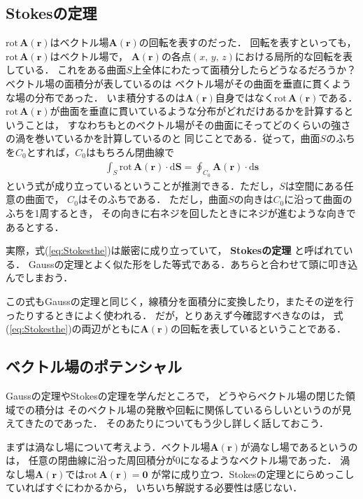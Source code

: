 \subsection{\textrm{ Stokes}の定理}
$\mathrm{rot} \, \bm{A}(\bm{r})$はベクトル場$\bm{A}(\bm{r})$の回転を表すのだった．
回転を表すといっても，$\mathrm{rot} \, \bm{A}(\bm{r})$はベクトル場で，
$\bm{A}(\bm{r})$の各点$(x, \, y, \, z)$における局所的な回転を表している．
これをある曲面$S$上全体にわたって面積分したらどうなるだろうか？ ベクトル場の面積分が表しているのは
ベクトル場がその曲面を垂直に貫くような場の分布であった．
いま積分するのは$\bm{A}(\bm{r})$自身ではなく$\mathrm{rot} \, \bm{A}(\bm{r})$である．
$\mathrm{rot} \, \bm{A}(\bm{r})$が曲面を垂直に貫いているような分布がどれだけあるかを計算するということは，
すなわちもとのベクトル場がその曲面にそってどのくらいの強さの渦を巻いているかを計算しているのと
同じことである．従って，曲面$S$のふちを$C_0$とすれば，$C_0$はもちろん閉曲線で
\begin{eqnarray}
\int_S \mathrm{rot} \, \bm{A}(\bm{r}) \cdot \mathrm{d} \bm{S} =
\oint_{C_0} \bm{A}(\bm{r}) \cdot \mathrm{d}\bm{s}
\label{eq:Stokesthe}
\end{eqnarray}
という式が成り立っているということが推測できる．ただし，$S$は空間にある任意の曲面で，
$C_0$はそのふちである．
ただし，曲面$S$の向きは$C_0$に沿って曲面のふちを1周するとき，
その向きに右ネジを回したときにネジが進むような向きであるとする．

実際，式(\ref{eq:Stokesthe})は厳密に成り立っていて，
\textbf{Stokesの定理}
と呼ばれている．
Gaussの定理とよく似た形をした等式である．あちらと合わせて頭に叩き込んでしまおう．

この式もGaussの定理と同じく，線積分を面積分に変換したり，またその逆を行ったりするときによく使われる．
だが，とりあえず今確認すべきなのは，
式(\ref{eq:Stokesthe})の両辺がともに$\bm{A}(\bm{r})$の回転を表しているということである．

\subsection{ベクトル場のポテンシャル}
Gaussの定理やStokesの定理を学んだところで，
どうやらベクトル場の閉じた領域での積分は
そのベクトル場の発散や回転に関係しているらしいというのが見えてきたのであった．
そのあたりについてもう少し詳しく話しておこう．

まずは渦なし場について考えよう．ベクトル場$\bm{A}(\bm{r})$が渦なし場であるというのは，
任意の閉曲線に沿った周回積分が0になるようなベクトル場であった．
渦なし場$\bm{A}(\bm{r})$では$\mathrm{rot} \, \bm{A}(\bm{r}) = \bm{0}$
が常に成り立つ．Stokesの定理とにらめっこしていればすぐにわかるから，
いちいち解説する必要性は感じない．

